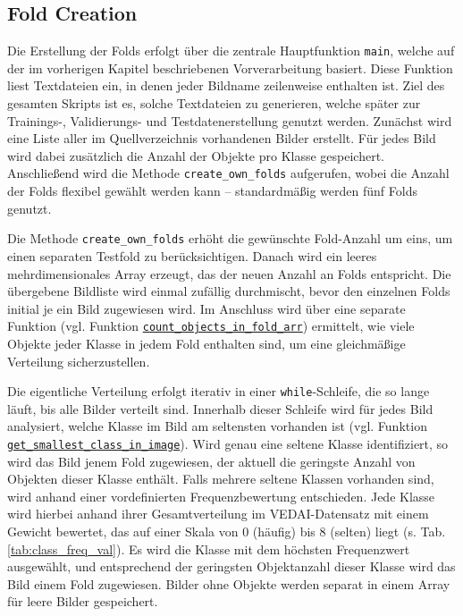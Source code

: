 \subsection{Fold Creation}
\label{subsec:Fold_creation}


Die Erstellung der Folds erfolgt über die zentrale Hauptfunktion \lstinline|main|, welche auf der im vorherigen Kapitel beschriebenen Vorverarbeitung basiert. Diese Funktion liest Textdateien ein, in denen jeder Bildname zeilenweise enthalten ist. Ziel des gesamten Skripts ist es, solche Textdateien zu generieren, welche später zur Trainings-, Validierungs- und Testdatenerstellung genutzt werden. Zunächst wird eine Liste aller im Quellverzeichnis vorhandenen Bilder erstellt. Für jedes Bild wird dabei zusätzlich die Anzahl der Objekte pro Klasse gespeichert. Anschließend wird die Methode \lstinline|create_own_folds| aufgerufen, wobei die Anzahl der Folds flexibel gewählt werden kann – standardmäßig werden fünf Folds genutzt.

Die Methode \lstinline|create_own_folds| erhöht die gewünschte Fold-Anzahl um eins, um einen separaten Testfold zu berücksichtigen. Danach wird ein leeres mehrdimensionales Array erzeugt, das der neuen Anzahl an Folds entspricht. Die übergebene Bildliste wird einmal zufällig durchmischt, bevor den einzelnen Folds initial je ein Bild zugewiesen wird. Im Anschluss wird über eine separate Funktion (vgl. Funktion \hyperlink{par:count_objects_in_fold_arr}{\lstinline|count_objects_in_fold_arr|}) ermittelt, wie viele Objekte jeder Klasse in jedem Fold enthalten sind, um eine gleichmäßige Verteilung sicherzustellen.

Die eigentliche Verteilung erfolgt iterativ in einer \texttt{while}-Schleife, die so lange läuft, bis alle Bilder verteilt sind. Innerhalb dieser Schleife wird für jedes Bild analysiert, welche Klasse im Bild am seltensten vorhanden ist (vgl. Funktion \hyperlink{par:get_smallest_class_in_image}{\lstinline|get_smallest_class_in_image|}). Wird genau eine seltene Klasse identifiziert, so wird das Bild jenem Fold zugewiesen, der aktuell die geringste Anzahl von Objekten dieser Klasse enthält. Falls mehrere seltene Klassen vorhanden sind, wird anhand einer vordefinierten Frequenzbewertung entschieden. Jede Klasse wird hierbei anhand ihrer Gesamtverteilung im \acrshort{VEDAI}-Datensatz mit einem Gewicht bewertet, das auf einer Skala von 0 (häufig) bis 8 (selten) liegt (s. Tab. \ref{tab:class_freq_val}). Es wird die Klasse mit dem höchsten Frequenzwert ausgewählt, und entsprechend der geringsten Objektanzahl dieser Klasse wird das Bild einem Fold zugewiesen. Bilder ohne Objekte werden separat in einem Array für leere Bilder gespeichert.

